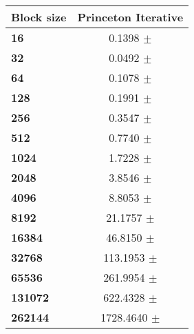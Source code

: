 \begin{tabular}{lc}\toprule
\textbf{Block size}  & \textbf{Princeton Iterative}\\\midrule
\textbf{16}  & 0.1398 $\pm$ \\
\textbf{32}  & 0.0492 $\pm$ \\
\textbf{64}  & 0.1078 $\pm$ \\
\textbf{128}  & 0.1991 $\pm$ \\
\textbf{256}  & 0.3547 $\pm$ \\
\textbf{512}  & 0.7740 $\pm$ \\
\textbf{1024}  & 1.7228 $\pm$ \\
\textbf{2048}  & 3.8546 $\pm$ \\
\textbf{4096}  & 8.8053 $\pm$ \\
\textbf{8192}  & 21.1757 $\pm$ \\
\textbf{16384}  & 46.8150 $\pm$ \\
\textbf{32768}  & 113.1953 $\pm$ \\
\textbf{65536}  & 261.9954 $\pm$ \\
\textbf{131072}  & 622.4328 $\pm$ \\
\textbf{262144} & 1728.4640 $\pm$ \\
\bottomrule
\end{tabular}
